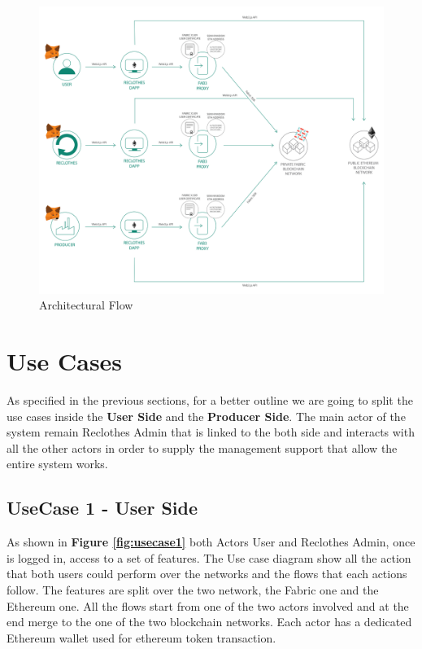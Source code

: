 \begin{figure}[h]
	\centering
	\includegraphics[totalheight=14cm]{img/architectural_flow.png}
	\caption{Architectural Flow}
    \label{fig:architectural-flow}
\end{figure}
 

\clearpage
\section{Use Cases}
\label{use-cases}

As specified in the previous sections, for a better outline we are going to split the use cases
inside the \textbf{User Side} and the \textbf{Producer Side}. The main actor of the system
remain Reclothes Admin that is linked to the both side and interacts with all the other
actors in order to supply the management support that allow the entire system works.

\subsection{UseCase 1 - User Side}

As shown in \textbf{Figure \ref{fig:usecase1}} both Actors User and Reclothes Admin, once is logged in, access to a set
of features. The Use case diagram show all the action that both users could perform over the networks and
the flows that each actions follow. The features are split over the two network, the Fabric one and the 
Ethereum one. All the flows start from one of the two actors involved and at the end merge to the one 
of the two blockchain networks. Each actor has a dedicated Ethereum wallet used for ethereum token
transaction. 
\bigskip

